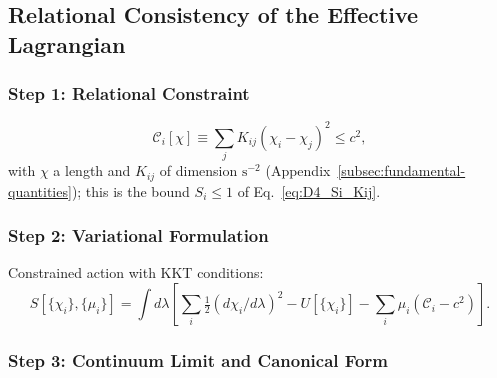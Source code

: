 \subsection{Relational Consistency of the Effective Lagrangian}
  \label{sec:born-lagrangian_derivation}

  \subsubsection*{Step 1: Relational Constraint}
    \label{subsec:A12-relational-constraint_v171}

    \begin{equation}
      \mathcal{C}_i[\chi]
      \equiv
      \sum_j K_{ij}(\chi_i - \chi_j)^2
      \le c^2,
      \label{eq:A12-relational-constraint_v171}
    \end{equation}
    with $\chi$ a length and $K_{ij}$ of dimension $\mathrm{s}^{-2}$
    (Appendix~\ref{subsec:fundamental-quantities}); this is the bound $S_i \le 1$ of Eq.~\eqref{eq:D4_Si_Kij}.

  \subsubsection*{Step 2: Variational Formulation}
    \label{subsec:A12-variational-structure_v171}

    Constrained action with KKT conditions:
    \begin{equation}
      S[\{\chi_i\},\{\mu_i\}]
      = \int d\lambda
      \left[
        \sum_i \tfrac{1}{2}
      (d\chi_i/d\lambda)^2
      - U[\{\chi_i\}]
      - \sum_i \mu_i
      (\mathcal{C}_i - c^2)
      \right].
      \label{eq:A12-action_v171}
    \end{equation}

  \subsubsection*{Step 3: Continuum Limit and Canonical Form}
    \label{subsec:A12-continuum-limit_v171}

